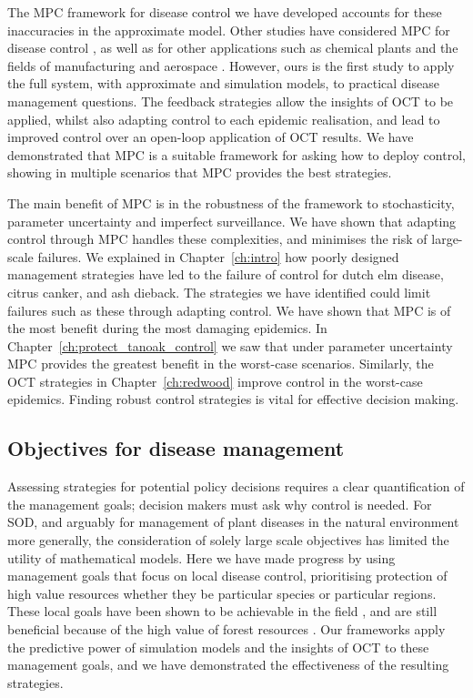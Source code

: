 The MPC framework for disease control we have developed accounts for these inaccuracies in the approximate model. Other studies have considered MPC for disease control \citep{selley_dynamic_2015}, as well as for other applications such as chemical plants and the fields of manufacturing and aerospace \citep{qin_survey_2003}. However, ours is the first study to apply the full system, with approximate and simulation models, to practical disease management questions. The feedback strategies allow the insights of OCT to be applied, whilst also adapting control to each epidemic realisation, and lead to improved control over an open-loop application of OCT results. We have demonstrated that MPC is a suitable framework for asking how to deploy control, showing in multiple scenarios that MPC provides the best strategies.

The main benefit of MPC is in the robustness of the framework to stochasticity, parameter uncertainty and imperfect surveillance. We have shown that adapting control through MPC handles these complexities, and minimises the risk of large-scale failures. We explained in Chapter~\ref{ch:intro} how poorly designed management strategies have led to the failure of control for dutch elm disease, citrus canker, and ash dieback. The strategies we have identified could limit failures such as these through adapting control. We have shown that MPC is of the most benefit during the most damaging epidemics. In Chapter~\ref{ch:protect_tanoak_control} we saw that under parameter uncertainty MPC provides the greatest benefit in the worst-case scenarios. Similarly, the OCT strategies in Chapter~\ref{ch:redwood} improve control in the worst-case epidemics. Finding robust control strategies is vital for effective decision making.

\subsection{Objectives for disease management}

Assessing strategies for potential policy decisions requires a clear quantification of the management goals; decision makers must ask why control is needed. For SOD, and arguably for management of plant diseases in the natural environment more generally, the consideration of solely large scale objectives has limited the utility of mathematical models. Here we have made progress by using management goals that focus on local disease control, prioritising protection of high value resources whether they be particular species or particular regions. These local goals have been shown to be achievable in the field \citep{hansen_efficacy_2019}, and are still beneficial because of the high value of forest resources \citep{green_future}. Our frameworks apply the predictive power of simulation models and the insights of OCT to these management goals, and we have demonstrated the effectiveness of the resulting strategies.

